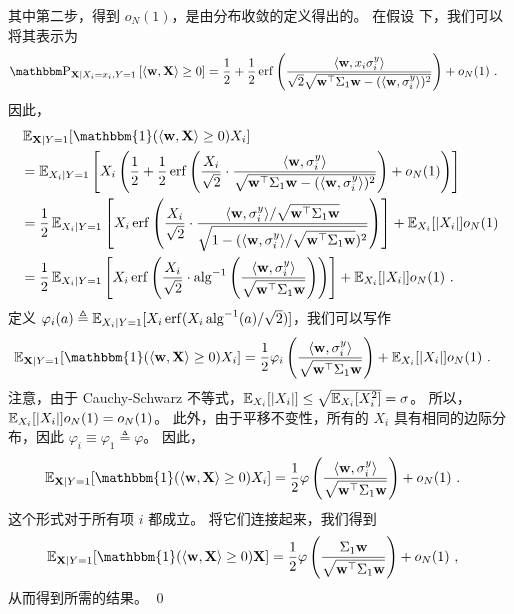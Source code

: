 其中第二步，得到 $o_N(1)$，是由分布收敛的定义得出的。
在假设  下，我们可以将其表示为
\begin{align*}
    \PR_{\mathbf{X} \mid X_i = x_i, Y = 1} \left[  \langle \mathbf{w}, \mathbf{X} \rangle \geq 0 \right]
    &= \frac{1}{2} + \frac{1}{2} \operatorname{erf}\left( \frac{\langle \mathbf{w}, x_i \sigma_i^y \rangle }{ \sqrt{2} \sqrt{ \mathbf{w}^\top \Sigma_1 \mathbf{w} - (\langle \mathbf{w}, \sigma_i^y \rangle)^2 } } \right) + o_N(1)~.
\end{align*}
因此，
\begin{align*}
    &\E_{\mathbf{X} \mid Y=1}[ \mathbbm{1}( \langle \mathbf{w}, \mathbf{X} \rangle \geq 0 ) X_i ] \\
    &= \E_{ X_i \mid Y=1 } \left[ X_i \left( \frac{1}{2} + \frac{1}{2} \operatorname{erf}\left( \frac{X_i}{\sqrt{2}} \cdot \frac{\langle \mathbf{w}, \sigma_i^y \rangle }{ \sqrt{ \mathbf{w}^\top \Sigma_1 \mathbf{w} - (\langle \mathbf{w}, \sigma_i^y \rangle)^2 } } \right) + o_N(1) \right) \right] \\
    &= \frac{1}{2} \E_{ X_i \mid Y=1 } \left[ X_i \operatorname{erf}\left( \frac{X_i}{\sqrt{2}} \cdot \frac{\langle \mathbf{w}, \sigma_i^y \rangle / \sqrt{\mathbf{w}^\top \Sigma_1 \mathbf{w}} }{ \sqrt{ 1 - (\langle \mathbf{w}, \sigma_i^y \rangle / \sqrt{\mathbf{w}^\top \Sigma_1 \mathbf{w}})^2 } } \right) \right] + \E_{X_i}[|X_i|] o_N(1) \\
    &= \frac{1}{2} \E_{ X_i \mid Y=1 } \left[ X_i \operatorname{erf}\left( \frac{X_i}{\sqrt{2}} \cdot \operatorname{alg}^{-1} \left( \frac{ \langle \mathbf{w}, \sigma_i^y \rangle }{ \sqrt{\mathbf{w}^\top \Sigma_1 \mathbf{w}} } \right) \right) \right] + \E_{X_i}[|X_i|] o_N(1)~.
\end{align*}
定义 $\varphi_i(a) \triangleq \operatorname{\mathbb{E}}_{X_i \mid Y=1}[ X_i \operatorname{erf}(X_i \operatorname{alg}^{-1}(a) / \sqrt{2}) ]$，我们可以写作
\begin{align*}
    \E_{\mathbf{X} \mid Y=1}[ \mathbbm{1}( \langle \mathbf{w}, \mathbf{X} \rangle \geq 0 ) X_i ]
    &= \frac{1}{2} \varphi_i \left( \frac{ \langle \mathbf{w}, \sigma_i^y \rangle }{ \sqrt{\mathbf{w}^\top \Sigma_1 \mathbf{w}} } \right) + \E_{X_i}[|X_i|] o_N(1)~.
\end{align*}
注意，由于 Cauchy-Schwarz 不等式，$\operatorname{\mathbb{E}}_{X_i}[|X_i|] \leq \sqrt{ \operatorname{\mathbb{E}}_{X_i}[X_i^2] } = \sigma$。
所以，$\operatorname{\mathbb{E}}_{X_i}[|X_i|] o_N(1) = o_N(1)$。
此外，由于平移不变性，所有的 $X_i$ 具有相同的边际分布，因此 $\varphi_i \equiv \varphi_1 \triangleq \varphi$。
因此，
\begin{align*}
    \E_{\mathbf{X} \mid Y=1}[ \mathbbm{1}( \langle \mathbf{w}, \mathbf{X} \rangle \geq 0 ) X_i ]
    &= \frac{1}{2} \varphi \left( \frac{ \langle \mathbf{w}, \sigma_i^y \rangle }{ \sqrt{\mathbf{w}^\top \Sigma_1 \mathbf{w}} } \right) + o_N(1)~.
\end{align*}
这个形式对于所有项 $i$ 都成立。
将它们连接起来，我们得到
\begin{align*}
    \E_{\mathbf{X} \mid Y=1}[ \mathbbm{1}( \langle \mathbf{w}, \mathbf{X} \rangle \geq 0 ) \mathbf{X} ]
    &= \frac{1}{2} \varphi \left( \frac{ \Sigma_1 \mathbf{w} }{ \sqrt{\mathbf{w}^\top \Sigma_1 \mathbf{w}} } \right) + o_N(1)~,
\end{align*}
从而得到所需的结果。
\qed

